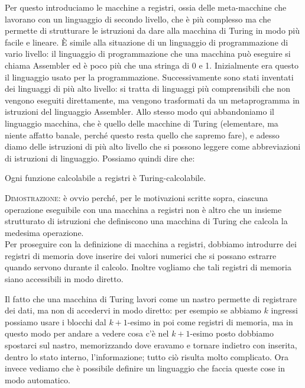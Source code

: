 Per questo introduciamo le macchine a registri, ossia delle
meta-macchine che lavorano con un linguaggio di secondo livello, che
\`e pi\`u complesso ma che permette di strutturare le istruzioni da
dare alla macchina di Turing in modo pi\`u facile e lineare. \`E
simile alla situazione di un linguaggio di programmazione di vario
livello: il linguaggio di programmazione che una macchina pu\`o
eseguire si chiama Assembler ed \`e poco pi\`u che una stringa di 0 e
1. Inizialmente era questo il linguaggio usato per la
programmazione. Successivamente sono stati inventati dei linguaggi di
pi\`u alto livello: si tratta di linguaggi pi\`u comprensibili che non
vengono eseguiti direttamente, ma vengono trasformati da un
metaprogramma in istruzioni del linguaggio Assembler.  Allo stesso
modo qui abbandoniamo il linguaggio macchina, che \`e quello delle
macchine di Turing (elementare, ma niente affatto banale, perch\'e
questo resta quello che sapremo fare), e adesso diamo delle istruzioni
di pi\`u alto livello che si possono leggere come abbreviazioni di
istruzioni di linguaggio. Possiamo quindi dire che:
\begin{thm}
Ogni funzione calcolabile a registri \`e Turing-cal\-co\-la\-bi\-le.
\end{thm}
\textsc{Dimostrazione}: \`e ovvio perch\'e, per le motivazioni scritte
sopra, ciascuna operazione eseguibile con una macchina a registri non
\`e altro che un insieme strutturato di istruzioni che definiscono una
macchina di Turing che calcola la medesima operazione.\\

Per proseguire con la definizione di macchina a registri, dobbiamo
introdurre dei registri di memoria dove inserire dei valori numerici
che si possano estrarre quando servono durante il calcolo. Inoltre
vogliamo che tali registri di memoria siano accessibili in modo
diretto.

Il fatto che una macchina di Turing lavori come un nastro permette di
registrare dei dati, ma non di accedervi in modo diretto: per esempio
se abbiamo \( k \) ingressi possiamo usare i blocchi dal \( k + 1
\)-esimo in poi come registri di memoria, ma in questo modo per andare
a vedere cosa c'\`e nel \( k + 1 \)-esimo posto dobbiamo spostarci sul
nastro, memorizzando dove eravamo e tornare indietro con inserita,
dentro lo stato interno, l'informazione; tutto ci\`o risulta molto
complicato.  Ora invece vediamo che \`e possibile definire un
linguaggio che faccia queste cose in modo automatico.


